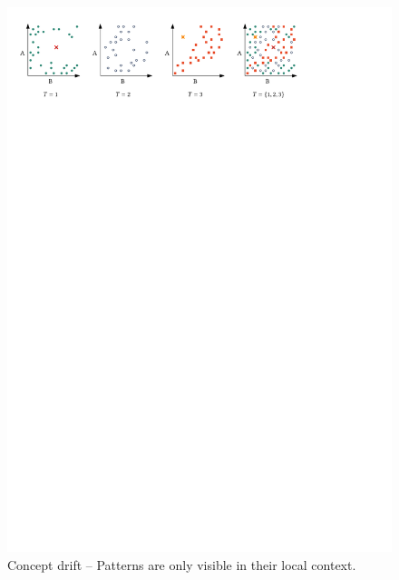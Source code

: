 \begin{figure}
	\centering
	\includegraphics[width=1.0\textwidth]{part1-figures/time_example-compressed.pdf}
	\caption{Concept drift -- Patterns are only visible in their local context.}\label{fig:drift}
\end{figure} 

